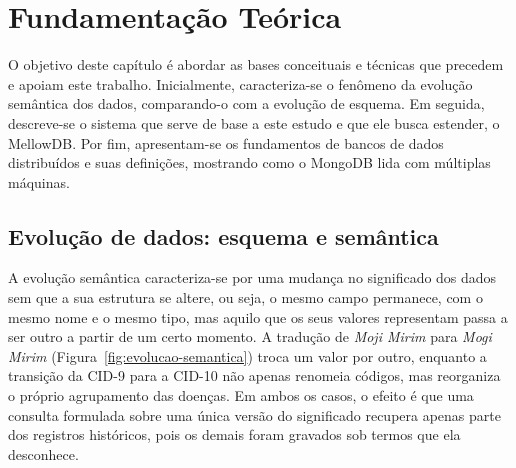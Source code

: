 \chapter{Fundamentação Teórica}
\label{cap:fundamentacao}

O objetivo deste capítulo é abordar as bases conceituais e técnicas que precedem e apoiam este trabalho. Inicialmente, caracteriza-se o fenômeno da evolução semântica dos dados, comparando-o com a evolução de esquema. Em seguida, descreve-se o sistema que serve de base a este estudo e que ele busca estender, o MellowDB. Por fim, apresentam-se os fundamentos de bancos de dados distribuídos e suas definições, mostrando como o MongoDB lida com múltiplas máquinas.

\section{Evolução de dados: esquema e semântica}
\label{sec:evolucao}
A evolução semântica caracteriza-se por uma mudança no significado dos dados sem que a sua estrutura se altere, ou seja, o mesmo campo permanece, com o mesmo nome e o mesmo tipo, mas aquilo que os seus valores representam passa a ser outro a partir de um certo momento. A tradução de \textit{Moji Mirim} para \textit{Mogi Mirim} (Figura~\ref{fig:evolucao-semantica}) troca um valor por outro, enquanto a transição da CID-9 para a CID-10 não apenas renomeia códigos, mas reorganiza o próprio agrupamento das doenças. Em ambos os casos, o efeito é que uma consulta formulada sobre uma única versão do significado recupera apenas parte dos registros históricos, pois os demais foram gravados sob termos que ela desconhece.

